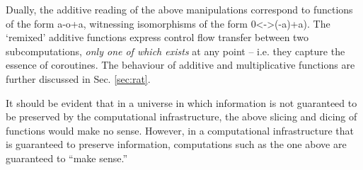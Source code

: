 \documentclass[preprint]{sigplanconf}
\begin{document}
Dually, the additive reading of the above manipulations correspond to
functions of the form {{a-o+a}}, witnessing isomorphisms of the form
{{0<->(-a)+a}}). The `remixed' additive functions express control flow
transfer between two subcomputations, \emph{only one of which exists}
at any point -- i.e. they capture the essence of coroutines. The
behaviour of additive and multiplicative functions are further
discussed in Sec. \ref{sec:rat}.

It should be evident that in a universe in which information is not
guaranteed to be preserved by the computational infrastructure, the
above slicing and dicing of functions would make no sense. However, in
a computational infrastructure that is guaranteed to preserve
information, computations such as the one above are guaranteed to
``make sense.''





\end{document}
